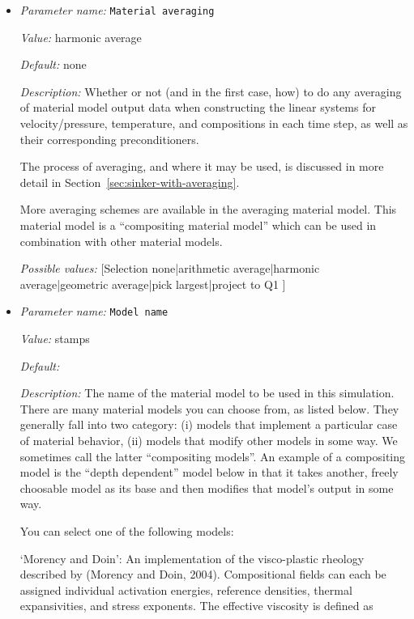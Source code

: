 \begin{itemize}
\item {\it Parameter name:} {\tt Material averaging}
\label{parameters:Material model/Material averaging}


{\it Value:} harmonic average


{\it Default:} none


{\it Description:} Whether or not (and in the first case, how) to do any averaging of material model output data when constructing the linear systems for velocity/pressure, temperature, and compositions in each time step, as well as their corresponding preconditioners.

The process of averaging, and where it may be used, is discussed in more detail in Section~\ref{sec:sinker-with-averaging}.

More averaging schemes are available in the averaging material model. This material model is a ``compositing material model'' which can be used in combination with other material models.


{\it Possible values:} [Selection none|arithmetic average|harmonic average|geometric average|pick largest|project to Q1 ]
\item {\it Parameter name:} {\tt Model name}
\label{parameters:Material model/Model name}


{\it Value:} stamps


{\it Default:} 


{\it Description:} The name of the material model to be used in this simulation. There are many material models you can choose from, as listed below. They generally fall into two category: (i) models that implement a particular case of material behavior, (ii) models that modify other models in some way. We sometimes call the latter ``compositing models''. An example of a compositing model is the ``depth dependent'' model below in that it takes another, freely choosable model as its base and then modifies that model's output in some way.

You can select one of the following models:

`Morency and Doin': An implementation of the visco-plastic rheology described by (Morency and Doin, 2004). Compositional fields can each be assigned individual activation energies, reference densities, thermal expansivities, and stress exponents. The effective viscosity is defined as


\end{itemize}
